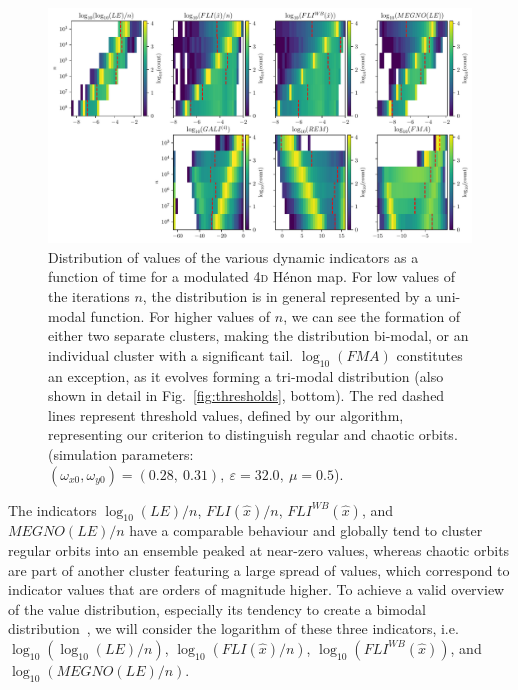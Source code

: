 \begin{chapterappendices}
\begin{figure}[ht]
    \includegraphics[width=\textwidth]{6_dynamic_indicators/fig/corrected_figs/evolution_idx_3.pdf}
    \caption{Distribution of values of the various dynamic indicators as a function of time for a modulated 4\textsc{d} Hénon map. For low values of the  iterations $n$, the distribution is in general represented by a uni-modal function. For higher values of $n$, we can see the formation of either two separate clusters, making the distribution bi-modal, or an individual cluster with a significant tail. $\log_{10}(FMA)$ constitutes an exception, as it evolves forming a tri-modal distribution (also shown in detail in Fig.~\ref{fig:thresholds}, bottom).
    The red dashed lines represent threshold values, defined by our algorithm, representing our criterion to distinguish regular and chaotic orbits. (simulation parameters: $(\omega_{x0},\omega_{y0})= (0.28,\ 0.31),\ \varepsilon=32.0,\ \mu=0.5$).}
    \label{fig:generic_example_2}
\end{figure}



The indicators $\log_{10}(LE)/n$, $FLI(\hat{x})/n$, $FLI^{WB}(\hat{x})$, and $MEGNO(LE)/n$ have a comparable behaviour and globally tend to cluster regular orbits into an ensemble peaked at near-zero values, whereas chaotic orbits are part of another cluster featuring a large spread of values, which correspond to indicator values that are orders of magnitude higher. To achieve a valid overview of the value distribution, especially its tendency to create a bimodal distribution~\cite{PhysRevE.60.2761,VALLEJO200326}, we will consider the logarithm of these three indicators, i.e.~$\log_{10}(\log_{10}(LE)/n)$, $\log_{10}(FLI(\hat{x})/n)$, $\log_{10}(FLI^{WB}(\hat{x}))$, and $\log_{10}(MEGNO(LE)/n)$.


\end{chapterappendices}
